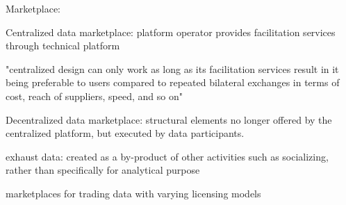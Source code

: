 

















Marketplace:


\cite{Aijan paperi} Centralized data marketplace:
platform operator provides facilitation services through technical platform

"centralized design can only work as long as its facilitation services result in it being preferable to users compared to repeated bilateral exchanges in terms of cost, reach of suppliers, speed, and so on"

Decentralized data marketplace: structural elements no longer offered by the centralized platform, but executed by data participants.


exhaust data: created as a by-product of other activities such as socializing, rather than specifically for analytical purpose

\cite{schomm2013marketplaces} marketplaces for trading data with varying licensing models










